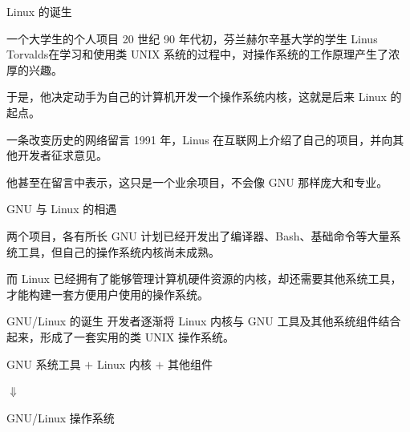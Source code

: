 \documentclass[aspectratio=169]{beamer}
\begin{document}
\begin{frame}{Linux 的诞生}
	\begin{block}{一个大学生的个人项目}
		\hspace*{2em}20 世纪 90 年代初，芬兰赫尔辛基大学的学生 Linus Torvalds在学习和使用类 UNIX 系统的过程中，对操作系统的工作原理产生了浓厚的兴趣。
		\par\hspace*{2em}于是，他决定动手为自己的计算机开发一个操作系统内核，这就是后来 Linux 的起点。
	\end{block}
	\pause
	\begin{block}{一条改变历史的网络留言}
		\hspace*{2em}1991 年，Linus 在互联网上介绍了自己的项目，并向其他开发者征求意见。
		\par\hspace*{2em}他甚至在留言中表示，这只是一个业余项目，不会像 GNU 那样庞大和专业。
	\end{block}
\end{frame}

\begin{frame}{GNU 与 Linux 的相遇}
	\begin{block}{两个项目，各有所长}
		\hspace*{2em}GNU 计划已经开发出了编译器、Bash、基础命令等大量系统工具，但自己的操作系统内核尚未成熟。
		\par\hspace*{2em}而 Linux 已经拥有了能够管理计算机硬件资源的内核，却还需要其他系统工具，才能构建一套方便用户使用的操作系统。
	\end{block}
	\pause
	\begin{block}{GNU/Linux 的诞生}
		\hspace*{2em}开发者逐渐将 Linux 内核与 GNU 工具及其他系统组件结合起来，形成了一套实用的类 UNIX 操作系统。	
		\begin{center}
			GNU 系统工具
			$+$
			Linux 内核
			$+$
			其他组件
			
			$\Downarrow$
			
			\alert{GNU/Linux 操作系统}
		\end{center}
	\end{block}

\end{frame}
\end{document}
